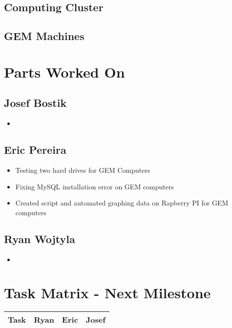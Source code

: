 \documentclass[12pt]{article}
\newcommand\tab[1][1cm]{\hspace*{#1}}
\begin{document}
\subsection{Computing Cluster}

\tab 

\subsection{GEM Machines}


\section{Parts Worked On}

\subsection{Josef Bostik}

\begin{itemize}
\item
\end{itemize}

\subsection{Eric Pereira}

\begin{itemize}
\item Testing two hard drives for GEM Computers
\item Fixing MySQL installation error on GEM computers
\item Created script and automated graphing data on Rapberry PI for GEM computers
\end{itemize}

\subsection{Ryan Wojtyla}

\begin{itemize}
\item
\end{itemize}

\section{Task Matrix - Next Milestone}

\begin{center}
  \begin{tabular}{|c|c|c|c|}
    \hline
    Task & Ryan & Eric & Josef \\
    \hline
    
    \hline
  \end{tabular}
\end{center}
\end{document}
